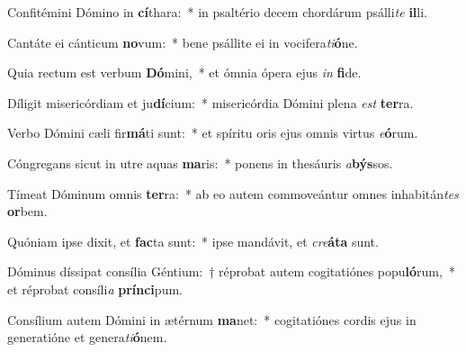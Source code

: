 \item Confitémini Dómino in \textbf{cí}thara:~* in psaltério decem chordárum psálli\textit{te} \textbf{il}li.
\item Cantáte ei cánticum \textbf{no}vum:~* bene psállite ei in vocifera\textit{ti}\textbf{ó}ne.
\item Quia rectum est verbum \textbf{Dó}mini,~* et ómnia ópera ejus \textit{in} \textbf{fi}de.
\item Díligit misericórdiam et ju\textbf{dí}cium:~* misericórdia Dómini plena \textit{est} \textbf{ter}ra.
\item Verbo Dómini cæli fir\textbf{má}ti sunt:~* et spíritu oris ejus omnis virtus \textit{e}\textbf{ó}rum.
\item Cóngregans sicut in utre aquas \textbf{ma}ris:~* ponens in thesáuris \textit{a}\textbf{býs}sos.
\item Tímeat Dóminum omnis \textbf{ter}ra:~* ab eo autem commoveántur omnes inhabitán\textit{tes} \textbf{or}bem.
\item Quóniam ipse dixit, et \textbf{fac}ta sunt:~* ipse mandávit, et \textit{cre}\textbf{á}\textbf{ta} sunt.
\item Dóminus díssipat consília Géntium:~† réprobat autem cogitatiónes popu\textbf{ló}rum,~* et réprobat consíli\textit{a} \textbf{prín}\textbf{ci}pum.
\item Consílium autem Dómini in ætérnum \textbf{ma}net:~* cogitatiónes cordis ejus in generatióne et genera\textit{ti}\textbf{ó}nem.
